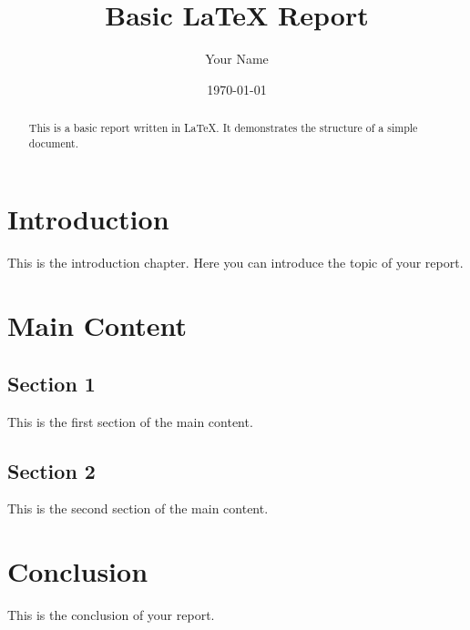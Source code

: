 \documentclass[a4paper,12pt]{report}
\title{Basic LaTeX Report}
\author{Your Name}
\date{\today}
\begin{document}
\maketitle

\begin{abstract}
This is a basic report written in \LaTeX. It demonstrates the structure of a simple document.
\end{abstract}

\tableofcontents

\chapter{Introduction}
This is the introduction chapter. Here you can introduce the topic of your report.


\chapter{Main Content}
\section{Section 1}
This is the first section of the main content.

\section{Section 2}
This is the second section of the main content.

\chapter{Conclusion}
This is the conclusion of your report.
\end{document}

